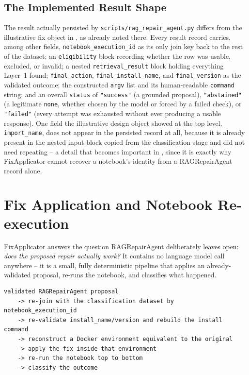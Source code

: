 \subsection{The Implemented Result Shape}

The result actually persisted by
\texttt{scripts/rag\_repair\_agent.py} differs from the illustrative fix
object in , as already noted there. Every result
record carries, among other fields, \texttt{notebook\_execution\_id} as its
only join key back to the rest of the dataset; an \texttt{eligibility} block
recording whether the row was usable, excluded, or invalid; a nested
\texttt{retrieval\_result} block holding everything Layer~1 found;
\texttt{final\_action}, \texttt{final\_install\_name}, and
\texttt{final\_version} as the validated outcome; the constructed
\texttt{argv} list and its human-readable \texttt{command} string; and an
overall \texttt{status} of \texttt{"success"} (a grounded proposal),
\texttt{"abstained"} (a legitimate \texttt{none}, whether chosen by the
model or forced by a failed check), or \texttt{"failed"} (every attempt was
exhausted without ever producing a usable response). One field the
illustrative design object showed at the top level, \texttt{import\_name},
does not appear in the persisted record at all, because it is already
present in the nested input block copied from the classification stage and
did not need repeating -- a detail that becomes important in
, since it is exactly why FixApplicator cannot recover
a notebook's identity from a RAGRepairAgent record alone.

\section{Fix Application and Notebook Re-execution}
\label{sec:m-fixapply}

FixApplicator answers the question RAGRepairAgent deliberately leaves open:
\emph{does the proposed repair actually work?} It contains no language
model call anywhere -- it is a small, fully deterministic pipeline that
applies an already-validated proposal, re-runs the notebook, and classifies
what happened.

\begin{verbatim}
validated RAGRepairAgent proposal
    -> re-join with the classification dataset by notebook_execution_id
    -> re-validate install_name/version and rebuild the install command
    -> reconstruct a Docker environment equivalent to the original
    -> apply the fix inside that environment
    -> re-run the notebook top to bottom
    -> classify the outcome
\end{verbatim}

